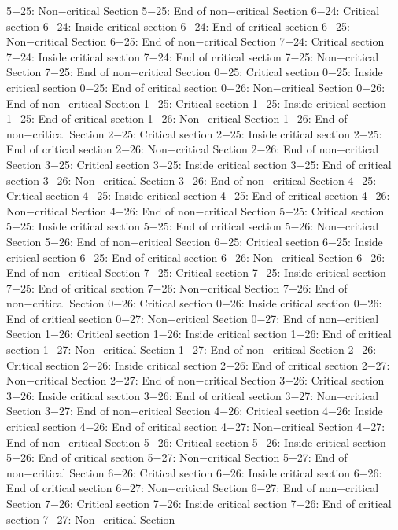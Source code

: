 5−25: Non−critical Section
5−25: End of non−critical Section
6−24: Critical section
6−24: Inside critical section
6−24: End of critical section
6−25: Non−critical Section
6−25: End of non−critical Section
7−24: Critical section
7−24: Inside critical section
7−24: End of critical section
7−25: Non−critical Section
7−25: End of non−critical Section
0−25: Critical section
0−25: Inside critical section
0−25: End of critical section
0−26: Non−critical Section
0−26: End of non−critical Section
1−25: Critical section
1−25: Inside critical section
1−25: End of critical section
1−26: Non−critical Section
1−26: End of non−critical Section
2−25: Critical section
2−25: Inside critical section
2−25: End of critical section
2−26: Non−critical Section
2−26: End of non−critical Section
3−25: Critical section
3−25: Inside critical section
3−25: End of critical section
3−26: Non−critical Section
3−26: End of non−critical Section
4−25: Critical section
4−25: Inside critical section
4−25: End of critical section
4−26: Non−critical Section
4−26: End of non−critical Section
5−25: Critical section
5−25: Inside critical section
5−25: End of critical section
5−26: Non−critical Section
5−26: End of non−critical Section
6−25: Critical section
6−25: Inside critical section
6−25: End of critical section
6−26: Non−critical Section
6−26: End of non−critical Section
7−25: Critical section
7−25: Inside critical section
7−25: End of critical section
7−26: Non−critical Section
7−26: End of non−critical Section
0−26: Critical section
0−26: Inside critical section
0−26: End of critical section
0−27: Non−critical Section
0−27: End of non−critical Section
1−26: Critical section
1−26: Inside critical section
1−26: End of critical section
1−27: Non−critical Section
1−27: End of non−critical Section
2−26: Critical section
2−26: Inside critical section
2−26: End of critical section
2−27: Non−critical Section
2−27: End of non−critical Section
3−26: Critical section
3−26: Inside critical section
3−26: End of critical section
3−27: Non−critical Section
3−27: End of non−critical Section
4−26: Critical section
4−26: Inside critical section
4−26: End of critical section
4−27: Non−critical Section
4−27: End of non−critical Section
5−26: Critical section
5−26: Inside critical section
5−26: End of critical section
5−27: Non−critical Section
5−27: End of non−critical Section
6−26: Critical section
6−26: Inside critical section
6−26: End of critical section
6−27: Non−critical Section
6−27: End of non−critical Section
7−26: Critical section
7−26: Inside critical section
7−26: End of critical section
7−27: Non−critical Section
